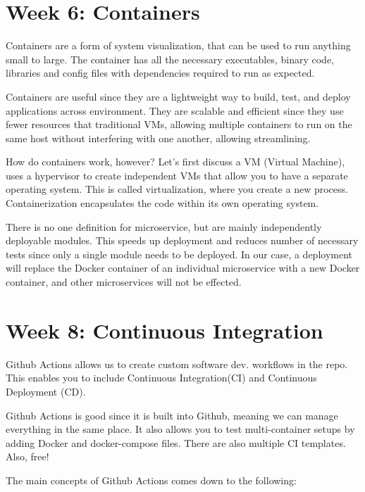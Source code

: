 \documentclass[11pt]{article}
\begin{document}
\section*{Week 6: Containers}
Containers are a form of system visualization, that can be used to run anything small to large. The container has all the necessary executables, binary code, libraries and config files with dependencies required to run as expected. 

\noindent Containers are useful since they are a lightweight way to build, test, and deploy applications across environment. They are scalable and efficient since they use fewer resources that traditional VMs, allowing multiple containers to run on the same host without interfering with one another, allowing streamlining.

\noindent How do containers work, however? Let's first discuss a VM (Virtual Machine), uses a hypervisor to create independent VMs that allow you to have a separate operating system. This is called virtualization, where you create a new process. Containerization encapsulates the code within its own operating system. 

\noindent There is no one definition for microservice, but are mainly independently deployable modules. This speeds up deployment and reduces number of necessary tests since only a single module needs to be deployed. In our case, a deployment will replace the Docker container of an individual microservice with a new Docker container, and other microservices will not be effected. 

\section*{Week 8: Continuous Integration}
Github Actions allows us to create custom software dev. workflows in the repo. This enables you to include Continuous Integration(CI) and Continuous Deployment (CD). 

\noindent Github Actions is good since it is built into Github, meaning we can manage everything in the same place. It also allows you to test multi-container setups by adding Docker and docker-compose files. There are also multiple CI templates. Also, free!

\noindent The main concepts of Github Actions comes down to the following:
\end{document}
